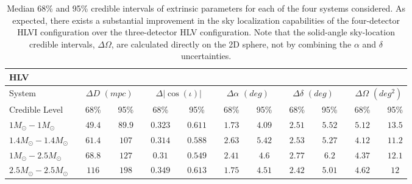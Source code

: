 \documentclass[11pt,a4paper]{emulateapj} 
\begin{document}
 
\begin{table}[h!]
\centering
\caption{Median 68\% and 95\% credible intervals of extrinsic parameters for
  each of the four systems considered.  As expected, there exists a
  substantial improvement in the sky localization capabilities of the
  four-detector HLVI configuration over the three-detector HLV
  configuration.  Note that the solid-angle sky-location credible
  intervals, $\Delta\Omega$, are calculated directly on the 2D sphere,
  not by combining the $\alpha$ and $\delta$ uncertainties.}
  
  \tabcolsep=0.11cm
      {\renewcommand{\arraystretch}{1.3} 
\begin{tabular}{lcccccccccccccccccccc}

\\ HLV\\

\hline\hline System & \vline & \multicolumn{3}{c}{$\Delta D$ $(mpc)$} & \vline &
\multicolumn{3}{c}{$\Delta |\cos(\iota)|$} & \vline & \multicolumn{3}{c}{$\Delta \alpha$ $(deg)$} & \vline &
\multicolumn{3}{c}{$\Delta \delta$ $(deg)$} & \vline & \multicolumn{3}{c}{$\Delta\Omega$
$(deg^2)$}\\\hline
Credible Level & \vline & 68\% & \vline & 95\% & \vline & 68\% & \vline & 95\% & \vline & 68\% & \vline & 95\% & \vline & 68\% & \vline & 95\% & \vline & 68\% & \vline & 95\% \\
 \hline\hline 

$1M_{\odot}-1M_{\odot}$ & \vline &$49.4$ & \vline &$89.9$ & \vline & $0.323$ & \vline &$0.611$ & \vline & $1.73$ & \vline &$4.09$ & \vline & $2.51$ & \vline &$5.52$ & \vline & $5.12$ & \vline &$13.5$\\\hline$1.4M_{\odot}-1.4M_{\odot}$ & \vline &$61.4$ & \vline &$107$ & \vline & $0.314$ & \vline &$0.588$ & \vline & $2.63$ & \vline &$5.42$ & \vline & $2.53$ & \vline &$5.27$ & \vline & $4.12$ & \vline &$11.2$\\\hline$1M_{\odot}-2.5M_{\odot}$ & \vline &$68.8$ & \vline &$127$ & \vline & $0.31$ & \vline &$0.549$ & \vline & $2.41$ & \vline &$4.6$ & \vline & $2.77$ & \vline &$6.2$ & \vline & $4.37$ & \vline &$12.1$\\\hline$2.5M_{\odot}-2.5M_{\odot}$ & \vline &$116$ & \vline &$198$ & \vline & $0.349$ & \vline &$0.613$ & \vline & $1.75$ & \vline &$4.51$ & \vline & $2.42$ & \vline &$5.01$ & \vline & $4.62$ & \vline &$12$\\

\hline\hline



\end{tabular}}
\end{table}
\end{document}
